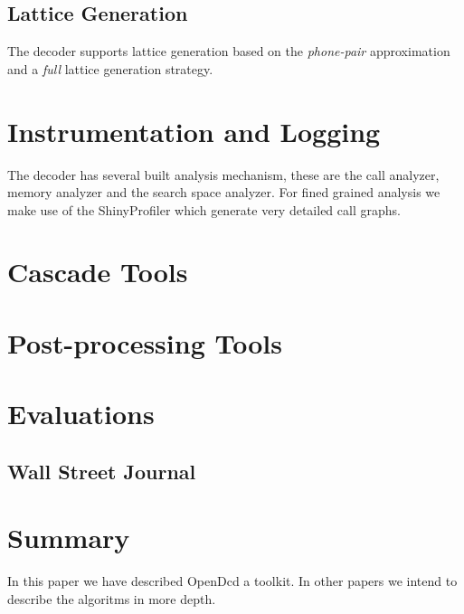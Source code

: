\documentclass{article}
\begin{document}
\subsection{Lattice Generation}
The decoder supports lattice generation based on the \emph{phone-pair}
approximation and a \emph{full} lattice generation strategy.

\section{Instrumentation and Logging}
\label{sec:instrumentation}
The decoder has several built analysis mechanism, these are the call analyzer,
memory analyzer and the search space analyzer. For fined grained analysis we 
make use of the ShinyProfiler which generate very detailed call graphs.

\section{Cascade Tools}
\label{sec:cascade}

\section{Post-processing Tools}
\label{sec:postprocess}

\section{Evaluations}
\label{sec:majhead}

\subsection{Wall Street Journal}

\section{Summary}
\label{sec:page}
In this paper we have described OpenDcd a toolkit. In other papers we intend to
describe the algoritms in more depth.



\end{document}
